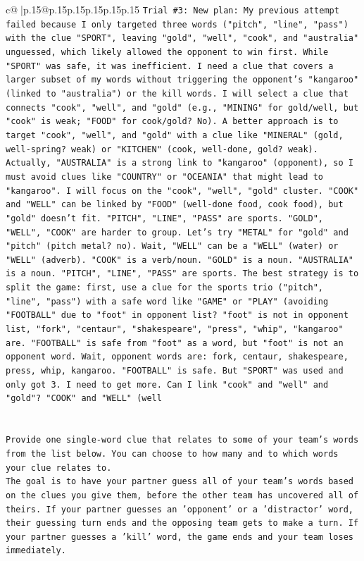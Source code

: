 \documentclass{article}
\begin{document}
{\begin{supertabular}{c@{$\;$}|p{.15\linewidth}@{}p{.15\linewidth}p{.15\linewidth}p{.15\linewidth}p{.15\linewidth}p{.15\linewidth}}
{{{\texttt{Trial \#3: New plan: My previous attempt failed because I only targeted three words ("pitch", "line", "pass") with the clue "SPORT", leaving "gold", "well", "cook", and "australia" unguessed, which likely allowed the opponent to win first. While "SPORT" was safe, it was inefficient. I need a clue that covers a larger subset of my words without triggering the opponent's "kangaroo" (linked to "australia") or the kill words. I will select a clue that connects "cook", "well", and "gold" (e.g., "MINING" for gold/well, but "cook" is weak; "FOOD" for cook/gold? No). A better approach is to target "cook", "well", and "gold" with a clue like "MINERAL" (gold, well{-}spring? weak) or "KITCHEN" (cook, well{-}done, gold? weak). Actually, "AUSTRALIA" is a strong link to "kangaroo" (opponent), so I must avoid clues like "COUNTRY" or "OCEANIA" that might lead to "kangaroo". I will focus on the "cook", "well", "gold" cluster. "COOK" and "WELL" can be linked by "FOOD" (well{-}done food, cook food), but "gold" doesn't fit. "PITCH", "LINE", "PASS" are sports. "GOLD", "WELL", "COOK" are harder to group. Let's try "METAL" for "gold" and "pitch" (pitch metal? no). Wait, "WELL" can be a "WELL" (water) or "WELL" (adverb). "COOK" is a verb/noun. "GOLD" is a noun. "AUSTRALIA" is a noun. "PITCH", "LINE", "PASS" are sports. The best strategy is to split the game: first, use a clue for the sports trio ("pitch", "line", "pass") with a safe word like "GAME" or "PLAY" (avoiding "FOOTBALL" due to "foot" in opponent list? "foot" is not in opponent list, "fork", "centaur", "shakespeare", "press", "whip", "kangaroo" are. "FOOTBALL" is safe from "foot" as a word, but "foot" is not an opponent word. Wait, opponent words are: fork, centaur, shakespeare, press, whip, kangaroo. "FOOTBALL" is safe. But "SPORT" was used and only got 3. I need to get more. Can I link "cook" and "well" and "gold"? "COOK" and "WELL" (well} \\
\\ 
\\ 
\texttt{Provide one single{-}word clue that relates to some of your team's words from the list below. You can choose to how many and to which words your clue relates to.} \\
\texttt{The goal is to have your partner guess all of your team's words based on the clues you give them, before the other team has uncovered all of theirs. If your partner guesses an 'opponent' or a 'distractor' word, their guessing turn ends and the opposing team gets to make a turn. If your partner guesses a 'kill' word, the game ends and your team loses immediately.} \\
}}}
\end{supertabular}}
\end{document}
